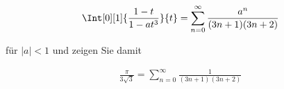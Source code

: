 
\begin{exercise}

\phantom{}

\begin{align*}
    \Int[0][1]
    {
        \frac{1 - t}{1 - a t^3}
    }{t}
    =
    \sum_{n=0}^\infty
    \frac
    {
        a^n
    }{
        (3 n + 1)
        (3 n + 2)
    }
\end{align*}

für $|a| < 1$ und zeigen Sie damit

\begin{align*}
    \frac{\pi}{3 \sqrt 3}
    =
    \sum_{n=0}^\infty
    \frac{1}
    {
        (3 n + 1)
        (3 n + 2)
    }
\end{align*}

\end{exercise}


